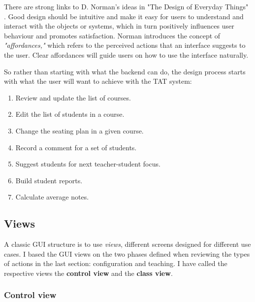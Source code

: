 \documentclass[10pt]{article}
\begin{document}
There are strong links to D. Norman's ideas in "The Design of Everyday Things" \cite{Norm13}. Good design should be intuitive and make it easy for users to understand and interact with the objects or systems, which in turn positively influences user behaviour and promotes satisfaction. Norman introduces the concept of \emph{"affordances,"} which refers to the perceived actions that an interface suggests to the user. Clear affordances will guide users on how to use the interface naturally.

So rather than starting with what the backend can do, the design process starts with what the user will want to achieve with the TAT system:
\begin{enumerate}
\item Review and update the list of courses.
\item Edit the list of students in a course.
\item Change the seating plan in a given course.
\item Record a comment for a set of students.
\item Suggest students for next teacher-student focus.
\item Build student reports.
\item Calculate average notes.
\end{enumerate}

\subsection{Views}
A classic GUI structure is to use \emph{views}, different screens designed for different use cases. I based the GUI views on the two phases defined when reviewing the types of actions in the last section: configuration and teaching. I have called the respective views the \textbf{control view} and the \textbf{class view}.

\subsubsection{Control view}
\end{document}
